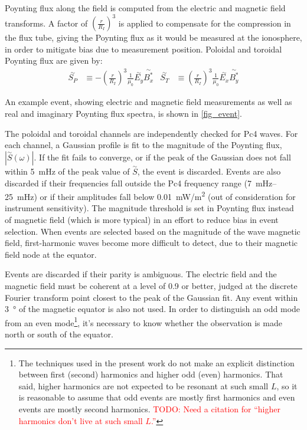 \documentclass{article}
\newcommand{\dft}[1]{\ensuremath{\overset{\sim}{#1}}\xspace}
\newcommand{\todo}[1]{ \textcolor{red}{TODO: #1} }
\newcommand{\lr}[1]{ \left( #1 \right) }
\renewcommand{\arg}[1]{\!\lr{#1}}
\newcommand{\mz}{\ensuremath{\mu_0}\xspace}
\begin{document}
Poynting flux along the field is computed from the electric and magnetic field transforms. A factor of $\lr{\frac{r}{R_I}}^3$ is applied to compensate for the compression in the flux tube, giving the Poynting flux as it would be measured at the ionosphere, in order to mitigate bias due to measurement position. Poloidal and toroidal Poynting flux are given by:
\begin{align}
  \dft{S_P} &\equiv -\lr{\frac{r}{R_I}}^3\frac{1}{\mz} \dft{E_y} \dft{B_x^*} &
  \dft{S_T} &\equiv  \lr{\frac{r}{R_I}}^3\frac{1}{\mz} \dft{E_x} \dft{B_y^*}
\end{align}

An example event, showing electric and magnetic field measurements as well as real and imaginary Poynting flux spectra, is shown in \cref{fig_event}.

The poloidal and toroidal channels are independently checked for Pc4 waves. For each channel, a Gaussian profile is fit to the magnitude of the Poynting flux, $|\dft{S}\arg{\omega}|$. If the fit fails to converge, or if the peak of the Gaussian does not fall within \SI{5}{\mHz} of the peak value of \dft{S}, the event is discarded. Events are also discarded if their frequencies fall outside the Pc4 frequency range (\SIrange{7}{25}{\mHz}) or if their amplitudes fall below \SI{0.01}{\mW/\m\squared} (out of consideration for instrument sensitivity). The magnitude threshold is set in Poynting flux instead of magnetic field (which is more typical) in an effort to reduce bias in event selection. When events are selected based on the magnitude of the wave magnetic field, first-harmonic waves become more difficult to detect, due to their magnetic field node at the equator\cite{dai_2015}.

Events are discarded if their parity is ambiguous. The electric field and the magnetic field must be coherent at a level of 0.9 or better, judged at the discrete Fourier transform point closest to the peak of the Gaussian fit. Any event within \SI{3}{\degree} of the magnetic equator is also not used. In order to distinguish an odd mode from an even mode\footnote{
The techniques used in the present work do not make an explicit distinction between first (second) harmonics and higher odd (even) harmonics. That said, higher harmonics are not expected to be resonant at such small $L$, so it is reasonable to assume that odd events are mostly first harmonics and even events are mostly second harmonics. \todo{Need a citation for ``higher harmonics don't live at such small $L$.''}
}, it's necessary to know whether the observation is made north or south of the equator.
\end{document}
